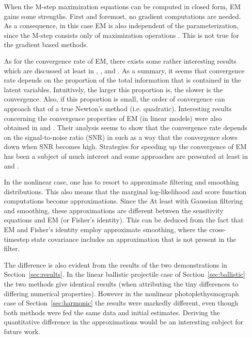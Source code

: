 When the M-step maximization equations
can be computed in closed form, EM gains some strengths.
First and foremost, no gradient computations are needed.
As a consequence, in this case EM is also independent
of the parameterization, since the M-step consists only of
maximization operations \parencite{Cappe2005}. This is not true
for the gradient based methods.

As for the convergence rate of EM, there exists some rather interesting results
which are discussed at least in 
\textcite{Salakhutdinov2003,Salakhutdinov2004},
\textcite{Petersen2005a}, and \textcite{Gibson2005}. As a summary,
it seems that convergence rate depends on the proportion 
of the total information that is contained in the latent variables. Intuitively,
the larger this proportion is, the slower is the convergence. Also, if this proportion
is small, the order of convergence can approach that of a true Newton's method (i.e. quadratic).
Interesting results concerning the convergence properties of EM (in linear models) were also
obtained in \textcite{Petersen2005a} and \textcite{Petersen2005}. Their analysis seems
to show that the convergence rate depends on the signal-to-noise ratio (SNR) in
such as a way that the convergence slows down when SNR becomes high.
Strategies for speeding up the convergence of EM has been
a subject of much interest and some approaches are presented at least
in \textcite{Meng1997} and \textcite{Lange1995}.

In the nonlinear case, one has to resort to approximate filtering and smoothing distributions.
This also means that the marginal log-likelihood and score function computations 
become approximations. Since the 
At least with Gaussian filtering and smoothing, these approximations are different between
the sensitivity equations and EM (or Fisher's identity). This can be deduced from the fact
that EM and Fisher's identity employ approximate smoothing, where the cross-timestep
state covariance includes an approximation that is not present in the filter. 

The difference is also evident from
the results of the two demonstrations in Section~\ref{sec:results}. In the linear ballistic projectile
case of Section~\ref{sec:ballistic} the two methods give identical results 
(when attributing the tiny differences
to differing numerical properties). However in the nonlinear photoplethysmograph case 
of Section~\ref{sec:harmonic} the results
were markedly different, even though both methods were fed the same data and initial estimates.
Deriving the quantitative difference in the approximations would be an interesting subject
for future work.


